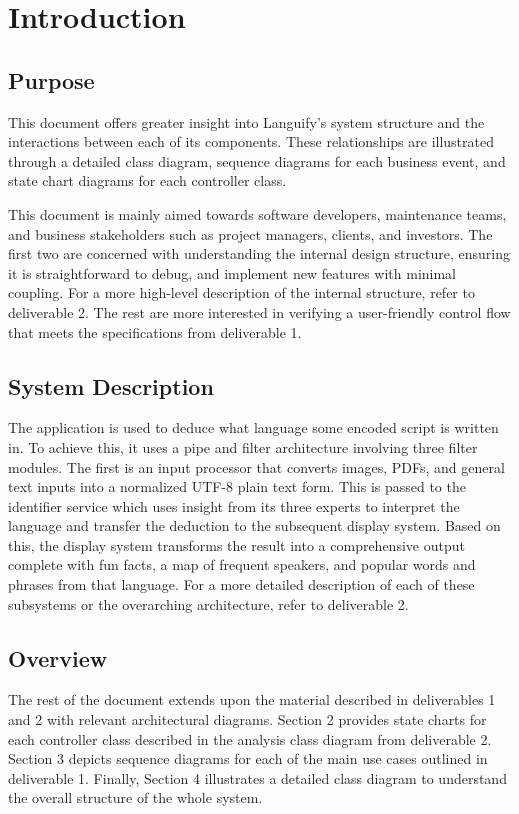 \section{Introduction}
\label{sec:introduction}


\subsection{Purpose}
\label{sub:purpose}
This document offers greater insight into Languify’s system structure and the interactions between each of its components. These relationships are illustrated through a detailed class diagram, sequence diagrams for each business event, and state chart diagrams for each controller class.\newline


\noindent This document is mainly aimed towards software developers, maintenance teams, and business stakeholders such as project managers, clients, and investors. The first two are concerned with understanding the internal design structure, ensuring it is straightforward to debug, and implement new features with minimal coupling. For a more high-level description of the internal structure, refer to deliverable 2. The rest are more interested in verifying a user-friendly control flow that meets the specifications from deliverable 1.


\subsection{System Description}
\label{sub:system_description}
The application is used to deduce what language some encoded script is written in. To achieve this, it uses a pipe and filter architecture involving three filter modules. The first is an input processor that converts images, PDFs, and general text inputs into a normalized UTF-8 plain text form. This is passed to the identifier service which uses insight from its three experts to interpret the language and transfer the deduction to the subsequent display system. Based on this, the display system transforms the result into a comprehensive output complete with fun facts, a map of frequent speakers, and popular words and phrases from that language. For a more detailed description of each of these subsystems or the overarching architecture, refer to deliverable 2. 


\subsection{Overview}
\label{sub:overview}
The rest of the document extends upon the material described in deliverables 1 and 2 with relevant architectural diagrams. Section 2 provides state charts for each controller class described in the analysis class diagram from deliverable 2. Section 3 depicts sequence diagrams for each of the main use cases outlined in deliverable 1. Finally, Section 4 illustrates a detailed class diagram to understand the overall structure of the whole system.  

